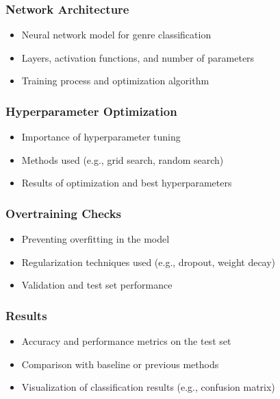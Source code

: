 \documentclass[8pt]{beamer}
\begin{document}
\begin{frame}
\frametitle{Network Architecture}

\begin{itemize}
\item Neural network model for genre classification
\item Layers, activation functions, and number of parameters
\item Training process and optimization algorithm
\end{itemize}

\end{frame}

\begin{frame}
\frametitle{Hyperparameter Optimization}

\begin{itemize}
\item Importance of hyperparameter tuning
\item Methods used (e.g., grid search, random search)
\item Results of optimization and best hyperparameters
\end{itemize}

\end{frame}

\begin{frame}
\frametitle{Overtraining Checks}

\begin{itemize}
\item Preventing overfitting in the model
\item Regularization techniques used (e.g., dropout, weight decay)
\item Validation and test set performance
\end{itemize}

\end{frame}

\begin{frame}
\frametitle{Results}

\begin{itemize}
\item Accuracy and performance metrics on the test set
\item Comparison with baseline or previous methods
\item Visualization of classification results (e.g., confusion matrix)
\end{itemize}
\end{frame}
\end{document}
